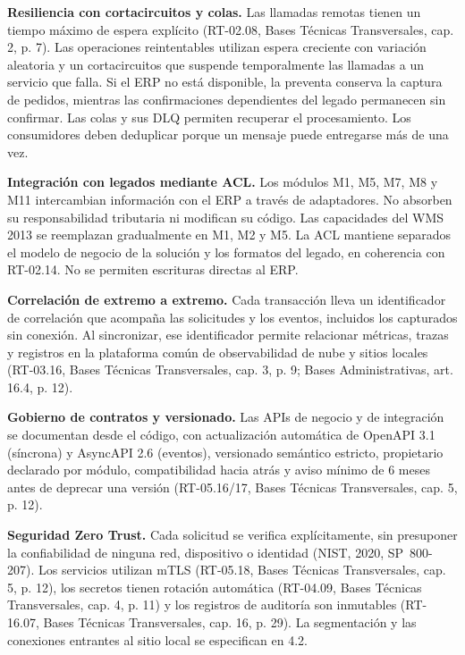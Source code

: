 \textbf{Resiliencia con cortacircuitos y colas.} Las llamadas remotas tienen un tiempo máximo de espera explícito (RT-02.08, Bases Técnicas Transversales, cap. 2, p. 7). Las operaciones reintentables utilizan espera creciente con variación aleatoria y un cortacircuitos que suspende temporalmente las llamadas a un servicio que falla. Si el ERP no está disponible, la preventa conserva la captura de pedidos, mientras las confirmaciones dependientes del legado permanecen sin confirmar. Las colas y sus DLQ permiten recuperar el procesamiento. Los consumidores deben deduplicar porque un mensaje puede entregarse más de una vez.

\textbf{Integración con legados mediante ACL.} Los módulos M1, M5, M7, M8 y M11 intercambian información con el ERP a través de adaptadores. No absorben su responsabilidad tributaria ni modifican su código. Las capacidades del WMS 2013 se reemplazan gradualmente en M1, M2 y M5. La ACL mantiene separados el modelo de negocio de la solución y los formatos del legado, en coherencia con RT-02.14. No se permiten escrituras directas al ERP.

\textbf{Correlación de extremo a extremo.} Cada transacción lleva un identificador de correlación que acompaña las solicitudes y los eventos, incluidos los capturados sin conexión. Al sincronizar, ese identificador permite relacionar métricas, trazas y registros en la plataforma común de observabilidad de nube y sitios locales (RT-03.16, Bases Técnicas Transversales, cap. 3, p. 9; Bases Administrativas, art. 16.4, p. 12).

\textbf{Gobierno de contratos y versionado.} Las APIs de negocio y de integración se documentan desde el código, con actualización automática de OpenAPI 3.1 (síncrona) y AsyncAPI 2.6 (eventos), versionado semántico estricto, propietario declarado por módulo, compatibilidad hacia atrás y aviso mínimo de 6 meses antes de deprecar una versión (RT-05.16/17, Bases Técnicas Transversales, cap. 5, p. 12).

\textbf{Seguridad Zero Trust.} Cada solicitud se verifica explícitamente, sin presuponer la confiabilidad de ninguna red, dispositivo o identidad (NIST, 2020, SP~800-207). Los servicios utilizan mTLS (RT-05.18, Bases Técnicas Transversales, cap. 5, p. 12), los secretos tienen rotación automática (RT-04.09, Bases Técnicas Transversales, cap. 4, p. 11) y los registros de auditoría son inmutables (RT-16.07, Bases Técnicas Transversales, cap. 16, p. 29). La segmentación y las conexiones entrantes al sitio local se especifican en 4.2.

